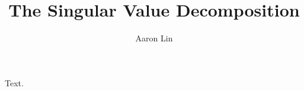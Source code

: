 \documentclass{akizumi-note}
\title{The Singular Value Decomposition}
\author{Aaron Lin}
\begin{document}
\maketitle
Text.
\end{document}

